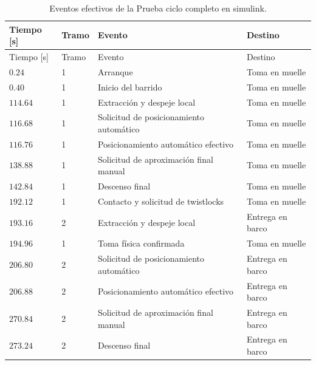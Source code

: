 \documentclass[a4paper,10pt,onecolumn,journal]{ieeeconf}
\numberwithin{equation}{section}
\begin{document}
\begin{longtable}{C{1.6cm} C{1.0cm} L{6.4cm} L{4.4cm}}

\caption{Eventos efectivos de la Prueba ciclo completo en simulink.}\label{tab:cronologia_prueba_ciclo_completo_en_simulink}\\

\toprule Tiempo [s] & Tramo & Evento & Destino\\\midrule\endfirsthead

\toprule Tiempo [s] & Tramo & Evento & Destino\\\midrule\endhead

$0.24$ & 1 & Arranque & Toma en muelle\\

$0.40$ & 1 & Inicio del barrido & Toma en muelle\\

$114.64$ & 1 & Extracción y despeje local & Toma en muelle\\

$116.68$ & 1 & Solicitud de posicionamiento automático & Toma en muelle\\

$116.76$ & 1 & Posicionamiento automático efectivo & Toma en muelle\\

$138.88$ & 1 & Solicitud de aproximación final manual & Toma en muelle\\

$142.84$ & 1 & Descenso final & Toma en muelle\\

$192.12$ & 1 & Contacto y solicitud de twistlocks & Toma en muelle\\

$193.16$ & 2 & Extracción y despeje local & Entrega en barco\\

$194.96$ & 1 & Toma física confirmada & Toma en muelle\\

$206.80$ & 2 & Solicitud de posicionamiento automático & Entrega en barco\\

$206.88$ & 2 & Posicionamiento automático efectivo & Entrega en barco\\

$270.84$ & 2 & Solicitud de aproximación final manual & Entrega en barco\\

$273.24$ & 2 & Descenso final & Entrega en barco\\


\end{longtable}
\end{document}
